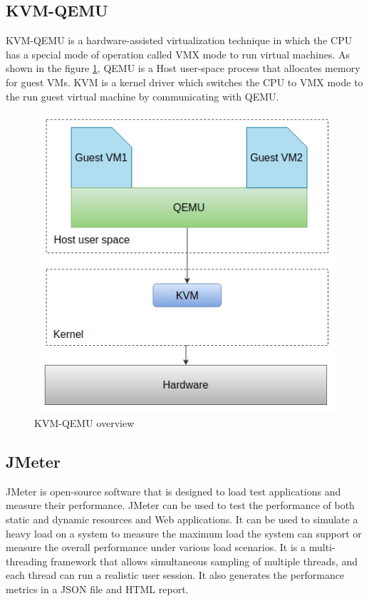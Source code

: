 \documentclass{iitbreport}
\begin{document}
\subsection{KVM-QEMU}
KVM-QEMU \cite{kvm_qemu} is a hardware-assisted virtualization technique in which the CPU has a special mode of operation called VMX mode to run virtual machines. As shown in the figure \ref{fig:kvm}, QEMU is a Host user-space process that allocates memory for guest VMs. KVM is a kernel driver which switches the CPU to VMX mode to the run guest virtual machine by communicating with QEMU.
\begin{figure}[!htb]
            \centering
            \includegraphics[scale=0.65]{Images/kvm.png}
            \caption{KVM-QEMU overview}
            \label{fig:kvm}
\end{figure}

\subsection{JMeter}
JMeter \cite{jmeter}  is open-source software that is designed to load test applications and measure their performance. JMeter can be used to test the performance of both static and dynamic resources and Web applications. It can be used to simulate a heavy load on a system to measure the maximum load the system can support or measure the overall performance under various load scenarios. It is a multi-threading framework that allows simultaneous sampling of multiple threads, and each thread can run a realistic user session. It also generates the performance metrics in a JSON file and HTML report.
\end{document}

